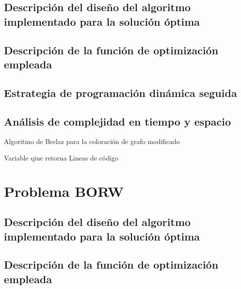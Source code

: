 \documentclass[a4paper,10pt]{article}
\begin{document}
  \subsection{Descripción del diseño del algoritmo implementado para la solución óptima}
  \hspace{2cm}

  \subsection{Descripción de la función de optimización empleada}
  \hspace{2cm}

  \subsection{Estrategia de programación dinámica seguida}
  \hspace{2cm}

  \subsection{Análisis de complejidad en tiempo y espacio}
  \hspace{2cm}

  \begin{algorithm}                  
  \caption{Algoritmo de Brelaz para la coloración de grafo modificado}         
  \label{BABY}                 
  \begin{algorithmic}[1]                 
      \ENSURE Variable qiue retorna
      \STATE Lineas de código
  \end{algorithmic}
  \end{algorithm}



\section{Problema BORW}

  \subsection{Descripción del diseño del algoritmo implementado para la solución óptima}
  \hspace{2cm}

  \subsection{Descripción de la función de optimización empleada}
  \hspace{2cm}
\end{document}

